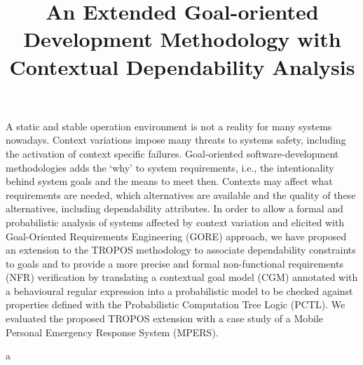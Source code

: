 \documentclass[mestrado]{unb-cic}
\title{An Extended Goal-oriented Development Methodology with Contextual Dependability Analysis}%
\begin{document}
  \maketitle

  \begin{dedicatoria}

  \end{dedicatoria}

  \begin{agradecimentos}

  \end{agradecimentos}


  \begin{resumo}
  A static and stable operation environment is not a reality for many systems nowadays. Context variations impose many threats to systems safety, including the activation of context specific failures. Goal-oriented software-development methodologies adds the `why' to system requirements, i.e., the intentionality behind system goals and the means to meet then. Contexts may affect what requirements are needed, which alternatives are available and the quality of these alternatives, including dependability attributes. In order to allow a formal and probabilistic analysis of systems affected by context variation and elicited with Goal-Oriented Requirements Engineering (GORE) approach, we have proposed an extension to the TROPOS methodology to associate dependability constraints to goals and to provide a more precise and formal non-functional requirements (NFR) verification by translating a contextual goal model (CGM) annotated with a behavioural regular expression into a probabilistic model to be checked against properties defined with the Probabilistic Computation Tree Logic (PCTL). We evaluated the proposed TROPOS extension with a case study of a Mobile Personal Emergency Response System (MPERS).
  
  
  \end{resumo}

  a
  \begin{abstract}
  	
  \end{abstract}
  \tableofcontents
  \listoffigures
  \listoftables

\renewcommand{\appendixname}{Anexo}


  \textual
  
  
  
  
    
      
  
  
      
  

  \postextual
  
  

\appendix
\end{document}
